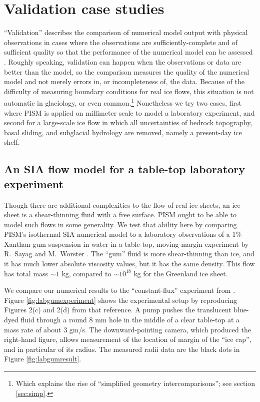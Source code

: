 
\section{Validation case studies}\label{sec:validation} 

``Validation'' describes the comparison of numerical model output with physical observations in cases where the observations are sufficiently-complete and of sufficient quality so that the performance of the numerical model can be assessed \cite{Roache,Wesseling}.  Roughly speaking, validation can happen when the observations or data are better than the model, so the comparison measures the quality of the numerical model and not merely errors in, or incompleteness of, the data.  Because of the difficulty of measuring boundary conditions for real ice flows, this situation is not automatic in glaciology, or even common.\footnote{Which explains the rise of ``simplified geometry intercomparisons''; see section \ref{sec:simp}.}  Nonetheless we try two cases, first where PISM is applied on millimeter scale to model a laboratory experiment, and second for a large-scale ice flow in which all uncertainties of bedrock topography, basal sliding, and subglacial hydrology are removed, namely a present-day ice shelf.

\subsection{An SIA flow model for a table-top laboratory experiment}\label{sec:labgum}
 

Though there are additional complexities to the flow of real ice sheets, an ice sheet is a shear-thinning fluid with a free surface.  PISM ought to be able to model such flows in some generality.  We test that ability here by comparing PISM's isothermal SIA numerical model to a laboratory observations of a 1\% Xanthan gum suspension in water in a table-top, moving-margin experiment by R.~Sayag and M.~Worster \cite{SayagWorster2013,SayagPeglerWorster2012}.  The ``gum'' fluid is more shear-thinning than ice, and it has much lower absolute viscosity values, but it has the same density.  This flow has total mass $\sim 1$ kg, compared to $\sim 10^{18}$ kg for the Greenland ice sheet.

We compare our numerical results to the ``constant-flux'' experiment from \cite{SayagWorster2013}.  Figure \ref{fig:labgumexperiment} shows the experimental setup by reproducing Figures 2(c) and 2(d) from that reference.  A pump pushes the translucent blue-dyed fluid through a round 8 mm hole in the middle of a clear table-top at a mass rate of about 3 gm/s.  The downward-pointing camera, which produced the right-hand figure, allows measurement of the location of margin of the ``ice cap'', and in particular of its radius.  The measured radii data are the black dots in Figure \ref{fig:labgumresult}.

